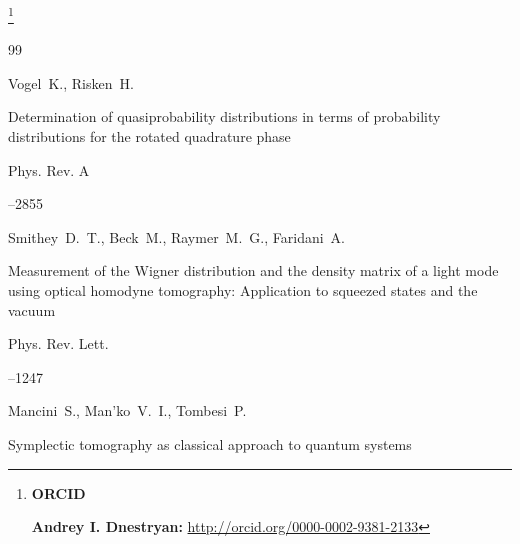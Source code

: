 %




\smallskip

 

 

 \makeentitle

 

\thanks{{\bf ORCID}



{\bf Andrey I. Dnestryan:} \url{http://orcid.org/0000-0002-9381-2133}



}



\EngRef



\begin{thebibliography}{99}




\by Vogel~K., Risken~H.

\paper Determination of quasiprobability distributions in  terms of probability distributions for the rotated  quadrature phase

\jour Phys. Rev. A




--2855





\by  Smithey~D.~T., Beck~M., Raymer~M.~G., Faridani~A.

\paper Measurement of the Wigner distribution and the density matrix of a light mode using optical homodyne tomography: Application to squeezed states and the vacuum

\jour Phys. Rev. Lett.




--1247







\by   Mancini~S.,  Man'ko~V.~I.,  Tombesi~P.

\paper Symplectic tomography as classical approach to quantum systems


\end{thebibliography}

